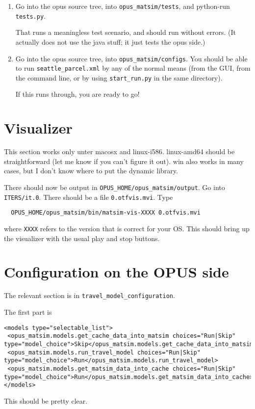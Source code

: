 \documentclass{article}
\begin{document}
\begin{enumerate}
\item Go into the opus source tree, into \verb$opus_matsim/tests$, and
python-run \verb$tests.py$.

That runs a meaningless test scenario, and should run without errors.
(It actually does not use the java stuff; it just tests the opus side.)

\item Go into the opus source tree, into \verb$opus_matsim/configs$.
You should be able to run \verb$seattle_parcel.xml$ by any of the
normal means (from the GUI, from the command line, or by using
\verb$start_run.py$ in the same directory).

If this runs through, you are ready to go!

\end{enumerate}

\section{Visualizer}

This section works only unter macosx and linux-i586.  linux-amd64
should be straightforward (let me know if you can't figure it out).
win also works in many cases, but I don't know where to put the
dynamic library.

There should now be output in \verb$OPUS_HOME/opus_matsim/output$.  Go
into \verb$ITERS/it.0$.  There should be a file \verb$0.otfvis.mvi$.
Type
\begin{verbatim}
  OPUS_HOME/opus_matsim/bin/matsim-vis-XXXX 0.otfvis.mvi
\end{verbatim}
where \verb$XXXX$ refers to the version that is correct for your OS.
This should bring up the visualizer with the usual play and stop
buttons.

\section{Configuration on the OPUS side}

The relevant section is in \verb$travel_model_configuration$.

The first part is
{\tiny
\begin{verbatim}
<models type="selectable_list">
 <opus_matsim.models.get_cache_data_into_matsim choices="Run|Skip" type="model_choice">Skip</opus_matsim.models.get_cache_data_into_matsim>
 <opus_matsim.models.run_travel_model choices="Run|Skip" type="model_choice">Run</opus_matsim.models.run_travel_model>
 <opus_matsim.models.get_matsim_data_into_cache choices="Run|Skip" type="model_choice">Run</opus_matsim.models.get_matsim_data_into_cache>
</models>
\end{verbatim}
}
This should be pretty clear.
\end{document}
